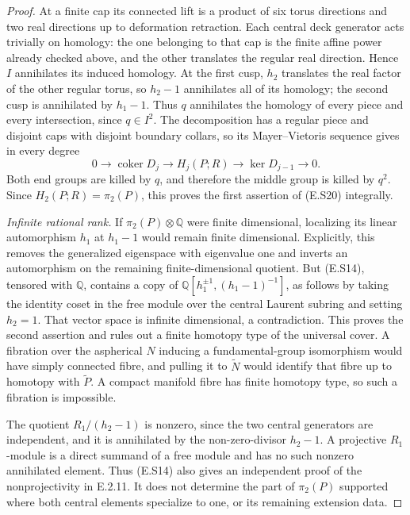 \begin{proof}
At a finite cap its connected lift is a product of six torus
directions and two real directions up to deformation retraction.
Each central deck generator acts trivially on homology: the
one belonging to that cap is the finite affine power already
checked above, and the other translates the regular real
direction. Hence $I$ annihilates its induced homology. At the
first cusp, $h_2$ translates the real factor of the other
regular torus, so $h_2-1$ annihilates all of its homology;
the second cusp is annihilated by $h_1-1$. Thus $q$ annihilates
the homology of every piece and every intersection, since
$q\in I^2$. The decomposition has a regular piece and disjoint
caps with disjoint boundary collars, so its Mayer--Vietoris
sequence gives in every degree
\[
 0\longrightarrow\operatorname{coker}D_j
   \longrightarrow H_j(P;R)
   \longrightarrow\ker D_{j-1}\longrightarrow0.
\]
Both end groups are killed by $q$, and therefore the middle
group is killed by $q^2$. Since $H_2(P;R)=\pi_2(P)$, this
proves the first assertion of (E.S20) integrally.

\emph{Infinite rational rank.}
If $\pi_2(P)\otimes\mathbb Q$ were finite dimensional,
localizing its linear automorphism $h_1$ at $h_1-1$ would
remain finite dimensional. Explicitly, this removes the
generalized eigenspace with eigenvalue one and inverts an
automorphism on the remaining finite-dimensional quotient.
But (E.S14), tensored with $\mathbb Q$, contains a copy of
$\mathbb Q[h_1^{\pm1},(h_1-1)^{-1}]$, as follows by taking
the identity coset in the free module over the central
Laurent subring and setting $h_2=1$. That vector space is
infinite dimensional, a contradiction. This proves the
second assertion and rules out a finite homotopy type of
the universal cover. A fibration over the aspherical $N$
inducing a fundamental-group isomorphism would have simply
connected fibre, and pulling it to $\widetilde N$ would
identify that fibre up to homotopy with $\widetilde P$.
A compact manifold fibre has finite homotopy type, so such
a fibration is impossible.

The quotient $R_1/(h_2-1)$ is nonzero, since the two central
generators are independent, and it is annihilated by the
non-zero-divisor $h_2-1$. A projective $R_1$-module is a
direct summand of a free module and has no such nonzero
annihilated element. Thus (E.S14) also gives an independent
proof of the nonprojectivity in E.2.11. It does not determine
the part of $\pi_2(P)$ supported where both central
elements specialize to one, or its remaining extension data.
\end{proof}


